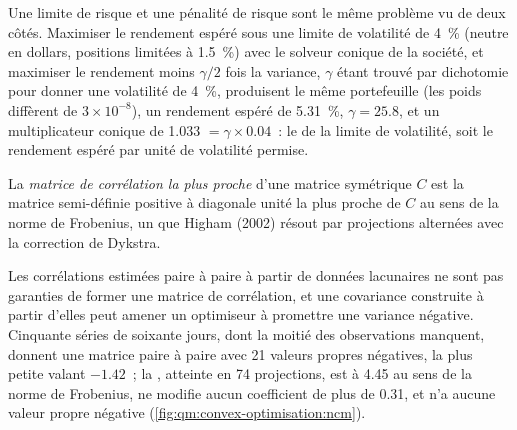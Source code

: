 Une limite de risque et une pénalité de risque sont le même problème vu de deux côtés. Maximiser le rendement espéré sous une limite de volatilité de 4~\% (neutre en dollars, positions limitées à 1.5~\%) avec le
solveur conique de la société, et maximiser le rendement moins $\gamma/2$ fois la variance, $\gamma$ étant trouvé par dichotomie pour donner une volatilité de 4~\%, produisent le même portefeuille (les poids diffèrent de
$3 \times 10^{-8}$), un rendement espéré de 5.31~\%, $\gamma = 25.8$, et un multiplicateur conique de 1.033 $= \gamma \times 0.04$~: le  de la limite de volatilité, soit le rendement espéré par unité
de volatilité permise.

\begin{definition}\label{def:qm:convex-optimisation:ncm}
La \emph{matrice de corrélation la plus proche} d'une matrice symétrique $C$ est la matrice semi-définie positive à diagonale unité la plus proche de $C$ au sens de la norme de Frobenius, un
 que Higham (2002) résout par projections alternées avec la correction de Dykstra.
\end{definition}

Les corrélations estimées paire à paire à partir de données lacunaires ne sont pas garanties de former une matrice de corrélation, et une covariance construite à partir d'elles peut amener un optimiseur à promettre une variance négative.
Cinquante séries de soixante jours, dont la moitié des observations manquent, donnent une matrice paire à paire avec 21 valeurs propres négatives, la plus petite valant $-1.42$~; la , atteinte en 74
projections, est à 4.45 au sens de la norme de Frobenius, ne modifie aucun coefficient de plus de 0.31, et n'a aucune valeur propre négative (\cref{fig:qm:convex-optimisation:ncm}).

